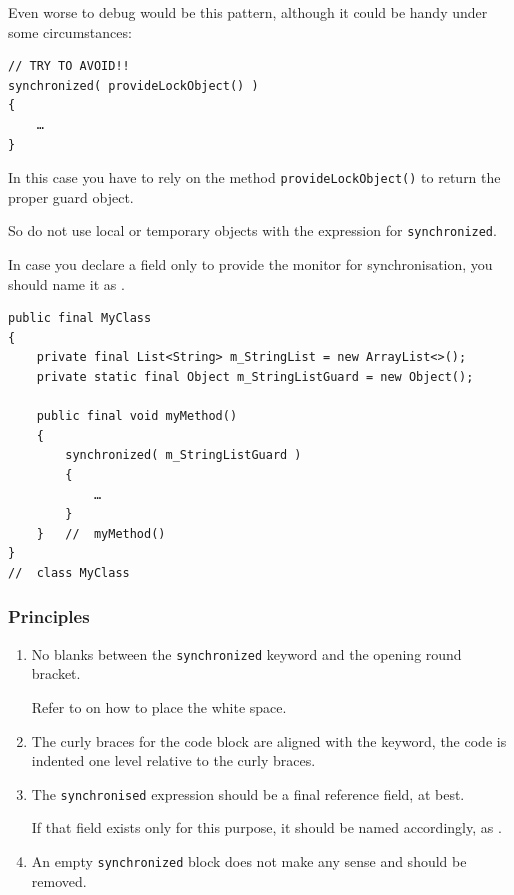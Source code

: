 Even worse to debug would be this pattern, although it could be handy under some circumstances:
\begin{lstlisting}
// TRY TO AVOID!!
synchronized( provideLockObject() )
{
    …
}
\end{lstlisting}
In this case you have to rely on the method \lstinline|provideLockObject()| to return the proper guard object.

So do not use local or temporary objects with the expression for \lstinline|synchronized|.

In case you declare a field only to provide the monitor for synchronisation, you should name it as .
\begin{lstlisting}
public final MyClass
{
    private final List<String> m_StringList = new ArrayList<>();
    private static final Object m_StringListGuard = new Object();
    
    public final void myMethod()
    {
        synchronized( m_StringListGuard )
        {
            …
        }
    }   //  myMethod()
}
//  class MyClass
\end{lstlisting}

\subsubsection{Principles}
\begin{enumerate}[label=P\arabic*.]
\item{No blanks between the \lstinline|synchronized| keyword and the opening round bracket.

Refer to  on how to place the white space.}
\item{The curly braces  for the code block are aligned with the keyword, the code is indented one level relative to the curly braces.}
\item{The \lstinline|synchronised| expression should be a final reference field, at best.

If that field exists only for this purpose, it should be named accordingly, as .}
\item{An empty \lstinline|synchronized| block does not make any sense and should be removed.}
\end{enumerate}

